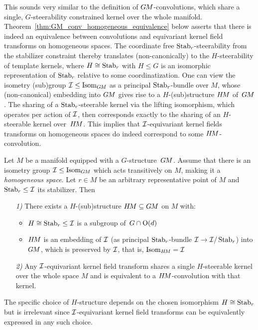 This sounds very similar to the definition of $G\mkern-1.4muM$-convolutions, which share a single, $G$-steerability constrained kernel over the whole manifold.
Theorem~\ref{thm:GM_conv_homogeneous_equivalence} below asserts that there is indeed an equivalence between convolutions and equivariant kernel field transforms on homogeneous spaces.
The coordinate free $\operatorname{Stab}_{r}$-steerability from the stabilizer constraint thereby translates (non-canonically) to the $H$-steerability of template kernels, where $H \cong \operatorname{Stab}_{r}$ with $H\leq G$ is an isomorphic representation of $\operatorname{Stab}_{r}$ relative to some coordinatization.
One can view the isometry (sub)group $\mathcal{I} \leq \operatorname{Isom}_{G\mkern-1.4muM}$ as a principal $\operatorname{Stab}_{r}$-bundle over $M$, whose (non-canonical) embedding into $G\mkern-1.4muM$ gives rise to a $H$-(sub)structure $H\mkern-2.5muM$ of~$G\mkern-1.4muM$.
The sharing of a $\operatorname{Stab}_{r}$-steerable kernel via the lifting isomorphism, which operates per action of $\mathcal{I}$,
then corresponds exactly to the sharing of an $H$-steerable kernel over~$H\mkern-2.5muM$.
This implies that $\mathcal{I}$-equivariant kernel fields transforms on homogeneous spaces do indeed correspond to some $H\mkern-2.5muM$-convolution.
\begin{thm}
\label{thm:GM_conv_homogeneous_equivalence}
    Let $M$ be a manifold equipped with a $G$-structure~$G\mkern-1.4muM$.
    Assume that there is an isometry group $\mathcal{I} \leq \operatorname{Isom}_{G\mkern-1.4muM}$ which acts transitively on $M$, making it a \emph{homogeneous space}.
    Let $r\in M$ be an arbitrary representative point of $M$ and $\operatorname{Stab}_{r} \leq \mathcal{I}$ its stabilizer.
    Then
    \begin{itemize}
        \item[\textit{1)}] There exists a $H$-(sub)structure $H\mkern-2.5muM \subseteq G\mkern-1.4muM$ on $M$ with:
            \begin{itemize}\setlength\itemsep{1ex}
                \item $H \cong \operatorname{Stab}_{r} \leq \mathcal{I}$ is a subgroup of~$G \cap \operatorname{O}(d)$
                \item $H\mkern-2.5muM$ is an embedding of $\mathcal{I}$ (as principal $\operatorname{Stab}_{r}$-bundle $\mathcal{I} \to \mathcal{I}/\operatorname{Stab}_{r}$) into $G\mkern-1.4muM$, which is preserved by $\mathcal{I}$, that is, $\operatorname{Isom}_{H\mkern-2.5muM} = \mathcal{I}$
            \end{itemize}
        \item[\textit{2)}] Any $\mathcal{I}$-equivariant kernel field transform shares a single $H$-steerable kernel over the whole space $M$ and is equivalent to a $H\mkern-2.5muM$-convolution with that kernel.
    \end{itemize}
    The specific choice of $H$-structure depends on the chosen isomorphism $H \cong \operatorname{Stab}_{r}$ but is irrelevant since $\mathcal{I}$-equivariant kernel field transforms can be equivalently expressed in any such choice.
\end{thm}
